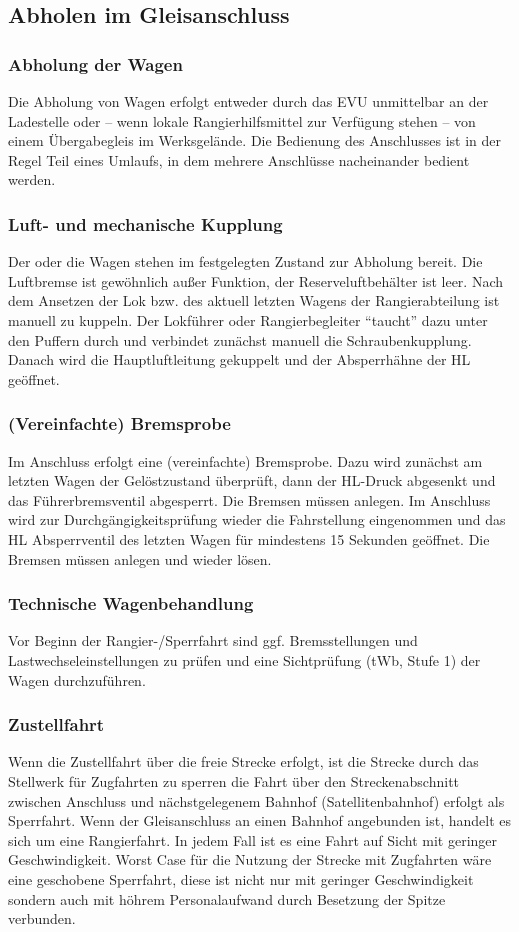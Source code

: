 \subsection{Abholen im Gleisanschluss}
\subsubsection{Abholung der Wagen}
Die Abholung von Wagen erfolgt entweder durch das EVU unmittelbar an der Ladestelle oder -- wenn lokale Rangierhilfsmittel zur Verfügung stehen -- von einem Übergabegleis im Werksgelände. Die Bedienung des Anschlusses ist in der Regel Teil eines Umlaufs, in dem mehrere Anschlüsse nacheinander bedient werden.
\subsubsection{Luft- und mechanische Kupplung}
Der oder die Wagen stehen im festgelegten Zustand zur Abholung bereit. Die Luftbremse ist gewöhnlich außer Funktion, der Reserveluftbehälter ist leer. Nach dem Ansetzen der Lok bzw. des aktuell letzten Wagens der Rangierabteilung ist manuell zu kuppeln. Der Lokführer oder Rangierbegleiter "`taucht"' dazu unter den Puffern durch und verbindet zunächst manuell die Schraubenkupplung. Danach wird die Hauptluftleitung gekuppelt und der Absperrhähne der HL geöffnet. %
\subsubsection{(Vereinfachte) Bremsprobe}
Im Anschluss erfolgt eine (vereinfachte) Bremsprobe. Dazu wird zunächst am letzten Wagen der Gelöstzustand überprüft, dann der HL-Druck abgesenkt und das Führerbremsventil abgesperrt. Die Bremsen müssen anlegen. Im Anschluss wird zur Durchgängigkeitsprüfung wieder die Fahrstellung eingenommen und das HL Absperrventil des letzten Wagen für mindestens 15 Sekunden geöffnet. Die Bremsen müssen anlegen und wieder lösen.
\subsubsection{Technische Wagenbehandlung}
Vor Beginn der Rangier-/Sperrfahrt sind ggf. Bremsstellungen %
und Lastwechseleinstellungen zu prüfen und eine Sichtprüfung (tWb, Stufe 1) der Wagen durchzuführen. 
\subsubsection{Zustellfahrt}
Wenn die Zustellfahrt über die freie Strecke erfolgt, ist die Strecke durch das Stellwerk für Zugfahrten zu sperren die Fahrt über den Streckenabschnitt zwischen Anschluss und nächstgelegenem Bahnhof (Satellitenbahnhof) erfolgt als Sperrfahrt. Wenn der Gleisanschluss an einen Bahnhof angebunden ist, handelt es sich um eine Rangierfahrt. In jedem Fall ist es eine Fahrt auf Sicht mit geringer Geschwindigkeit. Worst Case für die Nutzung der Strecke mit Zugfahrten wäre eine geschobene Sperrfahrt, diese ist nicht nur mit geringer Geschwindigkeit sondern auch mit höhrem Personalaufwand durch Besetzung der Spitze verbunden.

